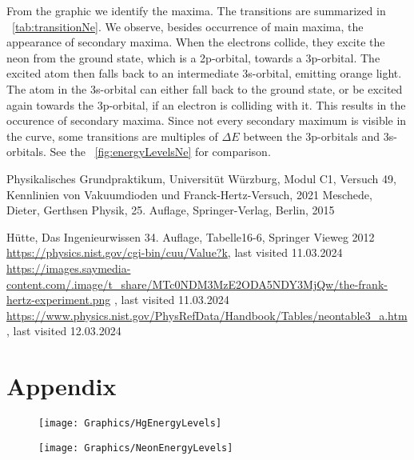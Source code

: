 \documentclass[a4paper,10pt,twocolumn]{article}
\begin{document}
    From the graphic we identify the maxima.
    The transitions are summarized in ~\autoref{tab:transitionNe}.
    We observe, besides occurrence of main maxima, the appearance of secondary maxima.
    When the electrons collide, they excite the neon from the ground state, which is a 2p-orbital, towards a 3p-orbital.
    The excited atom then falls back to an intermediate 3s-orbital, emitting orange light.
    The atom in the 3s-orbital can either fall back to the ground state, or be excited again towards the
    3p-orbital, if an electron is colliding with it.
    This results in the occurence of secondary maxima.
    Since not every secondary maximum is visible in the curve, some transitions are multiples of $\Delta E$
    between the 3p-orbitals and 3s-orbitals.
    See the ~\autoref{fig:energyLevelsNe} for comparison.
    


    \begin{thebibliography}{}    %
         Physikalisches Grundpraktikum, Universitüt Würzburg, Modul C1, Versuch 49, Kennlinien von Vakuumdioden
        und Franck-Hertz-Versuch, 2021
         Meschede, Dieter, Gerthsen Physik, 25. Auflage, Springer-Verlag, Berlin, 2015

          Hütte, Das Ingenieurwissen 34. Auflage, Tabelle16-6, Springer Vieweg 2012
          \url{https://physics.nist.gov/cgi-bin/cuu/Value?k}, last visited 11.03.2024
         \url{https://images.saymedia-content.com/.image/t_share/MTc0NDM3MzE2ODA5NDY3MjQw/the-frank-hertz-experiment.png} , last visited 11.03.2024
         \url{https://www.physics.nist.gov/PhysRefData/Handbook/Tables/neontable3_a.htm} , last visited 12.03.2024
    \end{thebibliography}
    
    \section{Appendix}

    \begin{figure}[htbp]
        \texttt{[image: Graphics/HgEnergyLevels]}
        \center
        \caption{}
        \label{fig:energyLevelsHg}
    \end{figure}

    \begin{figure}[htbp]
        \texttt{[image: Graphics/NeonEnergyLevels]}
        \center
        \caption{}
        \label{fig:energyLevelsNe}
    \end{figure}
\end{document}
